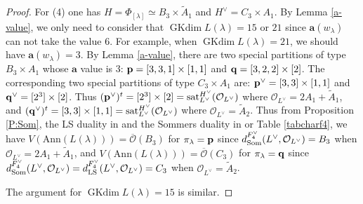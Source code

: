 \documentclass[reqno,12pt]{amsart}
\numberwithin{equation}{section}
\theoremstyle{plain}
\theoremstyle{definition}
\newcommand{\lam}{\lambda}
\newcommand{\Ann}{\mathrm{Ann}}
\newcommand{\aff}{ \mathbf{a} }
\newcommand{\gkd}{\operatorname{GKdim}}
\begin{document}
\begin{proof}
For (4) one has $H=\Phi_{[\lam]}\simeq B_3\times \tilde{A}_1$ and $H^{\vee}={C}_3 \times A_1$. By Lemma \ref{a-value}, we only need to consider  that $ \gkd L(\lam)=15 $ or $21$ since $\aff(w_{\lam})$ can not take the value $6$. For example, when $ \gkd L(\lam)=21$, we should have $\aff(w_{\lam})=3$. By Lemma \ref{a-value}, there are two special partitions of type $B_3\times {A}_1$ whose $\aff$ value is $3$: ${\bf p}=[3,3,1] \times [1,1]$ and ${\bf q}=[3,2,2] \times [2]$.
  The corresponding two special partitions of type $C_3\times A_1$ are:  ${\bf p}^{\vee}=[3,3] \times [1,1]$ and ${\bf q}^{\vee}=[2^3] \times [2]$. Thus $({\bf p}^{\vee})^t=[2^3]\times [2]={\rm sat}_{L^\vee}^{H^\vee} (\mathcal{O}_{L^\vee})$ where $\mathcal{O}_{L^\vee}=2A_1+\tilde{A}_1$, and $({\bf q}^{\vee})^t=[3,3]\times [1,1]={\rm sat}_{L^\vee}^{H^\vee} (\mathcal{O}_{L^\vee})$ where $\mathcal{O}_{L^\vee}=\tilde{A}_2$.  
  Thus from Proposition \ref{P:Som}, the LS duality in \cite[p. 440]{Ca85} and the Sommers duality in \cite[Table VII]{Sommers} or Table \ref{tabcharf4}, we have $V(\Ann (L(\lam)))=\overline{\mathcal{O}}(B_3)$ for $\pi_{\lam}={\bf p}$ since $ d_{\rm Som}^{F_4^\vee}(L^{\vee}, \mathcal{O}_{L^\vee})=B_3$ when $\mathcal{O}_{L^\vee}=2A_1+\tilde{A}_1$, and $V(\Ann (L(\lam)))=\overline{\mathcal{O}}(C_3)$ for $\pi_{\lam}={\bf q}$ since $ d_{\rm Som}^{F_4^\vee}(L^{\vee}, \mathcal{O}_{L^\vee})=d_{\rm LS}^{F_4^\vee}(L^{\vee}, \mathcal{O}_{L^\vee})=C_3$ when $\mathcal{O}_{L^\vee}=\tilde{A}_2$.

  The  argument for $\gkd L(\lam)=15$ is similar.





\end{proof}
\end{document}
